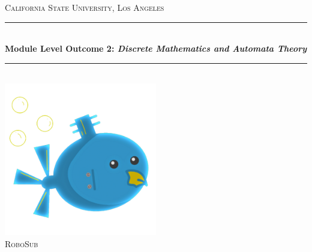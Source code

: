 \begin{titlepage} %

	\newcommand{\HRule}{\rule{\linewidth}{0.5mm}} %

	\center %


	\textsc{\LARGE California State University, Los Angeles}\\[1.5cm] %


	\HRule\\[0.4cm]

    {\huge\bfseries Module Level Outcome 2: \emph{Discrete Mathematics and
    Automata Theory}}\\[0.4cm] %

	\HRule\\[1.5cm]


	\vfill\vfill
	\includegraphics[width=0.5\textwidth]{../../ReportTemplate/robosub_logo.png}\\[1cm] %


	\textsc{\Large RoboSub}\\[0.5cm] %


\end{titlepage}

